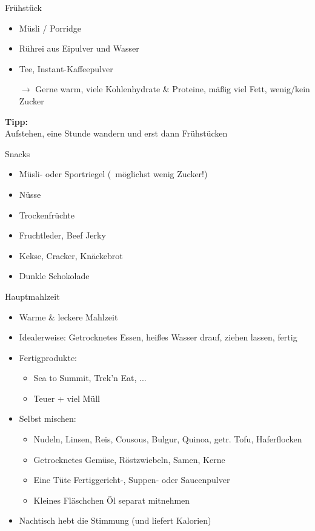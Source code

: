 \documentclass[aspectratio=169]{beamer}
\newcommand{\sarrow}{\small$\rightarrow$}
\newcommand{\tipp}[2][Tipp]{\vspace{0.2cm}\textbf{#1:}\\#2}
\begin{document}
			\begin{frame}{Frühstück}
				\begin{itemize}
					\item Müsli / Porridge
					\item Rührei aus Eipulver und Wasser
					\item Tee, Instant-Kaffeepulver
					\item[\sarrow] Gerne warm, viele Kohlenhydrate \& Proteine, mäßig viel Fett, wenig/kein Zucker
				\end{itemize}\pause
				\tipp{Aufstehen, eine Stunde wandern und erst dann Frühstücken}
			\end{frame}
			
			\begin{frame}{Snacks}
				\begin{itemize}
					\item Müsli- oder Sportriegel (\textrightarrow\ möglichst wenig Zucker!)
					\item Nüsse
					\item Trockenfrüchte
					\item Fruchtleder, Beef Jerky
					\item Kekse, Cracker, Knäckebrot
					\item Dunkle Schokolade
				\end{itemize}
			\end{frame}
			
			\begin{frame}{Hauptmahlzeit}
				\begin{itemize}
					\item Warme \& leckere Mahlzeit
					\item Idealerweise: Getrocknetes Essen, heißes Wasser drauf, ziehen lassen, fertig\pause
					\item Fertigprodukte:
					\begin{itemize}
						\item Sea to Summit, Trek'n Eat, ...
						\item Teuer + viel Müll
					\end{itemize}\pause
					\item Selbst mischen:
					\begin{itemize}
						\item Nudeln, Linsen, Reis, Cousous, Bulgur, Quinoa, getr. Tofu, Haferflocken
						\item Getrocknetes Gemüse, Röstzwiebeln, Samen, Kerne
						\item Eine Tüte Fertiggericht-, Suppen- oder Saucenpulver
						\item Kleines Fläschchen Öl separat mitnehmen
					\end{itemize}\pause
					\item Nachtisch hebt die Stimmung (und liefert Kalorien)
				\end{itemize}
			\end{frame}
			
\end{document}
